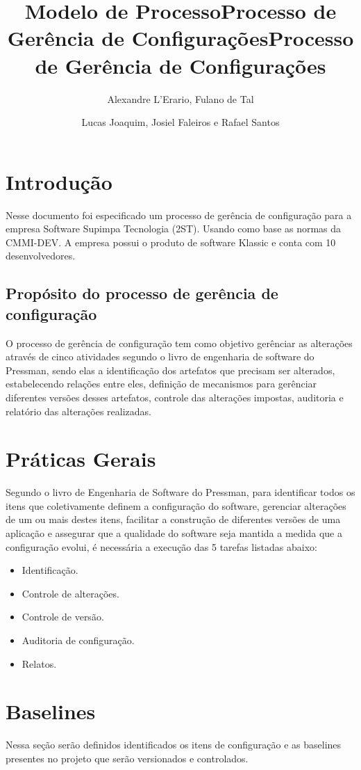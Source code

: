\documentclass{article}
\title{Modelo de Processo}
\title{Processo de Gerência de Configurações}
\author{Alexandre L'Erario, Fulano de Tal }  	%
\date{}
\title{Processo de Gerência de Configurações}
\author{Lucas Joaquim, Josiel Faleiros e Rafael Santos }
\begin{document}
	\maketitle
	\newpage
	\tableofcontents
	\newpage
	\section{Introdução}
    Nesse documento foi especificado um processo de gerência de configuração para a empresa Software Supimpa Tecnologia (2ST). Usando como base as normas da CMMI-DEV. A empresa possui o produto de software Klassic e conta com 10 desenvolvedores.
	    \subsection{Propósito do processo de gerência de configuração}
			O processo de gerência de configuração tem como objetivo gerênciar as alterações através de cinco atividades segundo o livro de engenharia de software do Pressman, sendo elas a identificação dos artefatos que precisam ser alterados, estabelecendo relações entre eles, definição de mecanismos para gerênciar diferentes versões desses artefatos, controle das alterações impostas, auditoria e relatório das alterações realizadas.
	\section{Práticas Gerais}
			Segundo o livro de Engenharia de Software do Pressman, para identificar todos os itens que coletivamente definem a configuração do software, gerenciar alterações de um ou mais destes itens, facilitar a construção de diferentes versões de uma aplicação e assegurar que a qualidade do software seja mantida a medida que a configuração evolui, é necessária a execução das 5 tarefas listadas abaixo:
        \begin{itemize}
			\item Identificação.
			\item Controle de alterações.
			\item Controle de versão. 
			\item Auditoria de configuração.
			\item Relatos.
		\end{itemize}
			
    \section{Baselines}
	    Nessa seção serão definidos identificados os itens de configuração e as baselines presentes no projeto que serão versionados e controlados.
\end{document}
